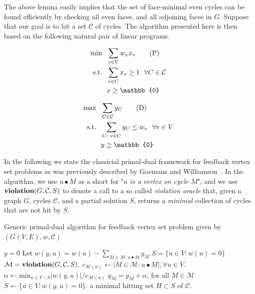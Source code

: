 \documentclass[letterpaper,11pt]{article}
\newcommand{\cmd}[1]{\ensuremath{\mbox{\bf #1}}}
\newcommand{\vio}{\ensuremath{\cmd{violation}}}
\newcommand{\st}{\ensuremath{\mbox{s.t.}}}
\newcommand{\MM}{{\mathcal M}}
\newcommand{\CC}{{\ensuremath{\mathcal C}}}
\newcommand{\0}{\mathbb{0}}
\newcommand{\1}{\mathbb{1}}
\begin{document}
The above lemma easily implies that the set of face-minimal even cycles can be found efficiently by 
checking all even faces, and all adjoining faces in $G$. Suppose that our goal is to hit a set $\mathcal{C}$ of cycles. The algorithm presented here is then based on the following natural pair of linear programs.

\medskip
\noindent\hspace*{-4ex}
\begin{minipage}{.47\textwidth}
\begin{align}
    \min ~~ & \sum_{v \in V} w_x x_v \tag{P} \label{primal}\\
    \st ~~ & \sum_{v \in C} x_v \geq 1 ~~ \forall C \in \mathcal{C} \notag\\
    & x \geq \0 \notag
\end{align}
\end{minipage}
\hspace*{.02\textwidth}
\vrule
\hspace*{.02\textwidth}
\begin{minipage}{.47\textwidth}
\begin{align}
\max ~~ & \sum_{C \in \mathcal{C} } y_C \tag{D} \label{dual} \\
\st ~~ &  \sum_{C:  \ v \in C} y_C \leq w_v ~~ \forall v \in V\notag \\
& y \geq \0 \notag
\end{align}
\end{minipage}
\medskip

In the following we state the classicial primal-dual framework for feedback vertex set problems as was previously described by Goemans and Williamson~\cite{GW97,GW98}. In the algorithm, we use $u \bullet M$ as a short for "{\em $u$ is a vertex on cycle $M$}", and we use $\vio(G,\CC,S)$ to denote a call to a so called {\em violation oracle} that, given a graph $G$, cycles \CC, and a partial solution $S$, returns a {\em minimal} collection of cycles that are not hit by $S$.

\medskip

\begin{algorithm}[H]
\caption{\cite{GW98}\label{pdalg} Generic primal-dual algorithm 
    for feedback vertex set problem given by $(G(V, E), w, \mathcal{C} )  $  }
\begin{algorithmic}
 \STATE $y  =  0$   
 \STATE Let $w(y,u) =  w(u) -  \sum_{{M \in \mathcal{M} : u \bullet M}}   y_M $ 
 \STATE $S = \{u \in V :   w(u) = 0 \}$
\STATE  $\MM= \vio(G, \CC, S)$.
\STATE $c_{ \MM (u) } \leftarrow |{M \in \MM : u \bullet M}|, \forall u \in V $.
 \STATE $ \alpha 
\leftarrow \text{min}_ {u \in V \backslash S} | w(y,u)| /
c_{\MM(u) } $ 
\STATE  $y_M = y_M + \alpha$, for all $M \in \MM$
$ S \leftarrow \{u \in V :  w(y,u) = 0 \}. $
\ENDWHILE 
\RETURN a minimal hitting set $ H \subset S $ of $\mathcal{C}$.
\end{algorithmic}
\end{algorithm} 
\end{document}
